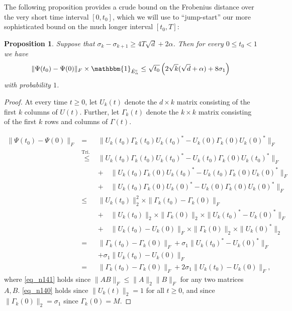 \documentclass[11pt,letterpaper]{article}
\newtheorem{proposition}[theorem]{Proposition}
\begin{document}
%
\noindent
The following proposition provides a crude bound on the Frobenius distance over the very short time interval $[0,t_0]$, which we will use to ``jump-start'' our more sophisticated bound on the much longer interval $[t_0, T]$:
%
\begin{proposition}\label{lemma_t0}
Suppose that  $\sigma_k - \sigma_{k+1} \geq 4T \sqrt{d} + 2\alpha$.
%
Then for every $0 \leq t_0 < 1$ we have
\begin{equation*}
    \|\Psi(t_0) - \Psi(0)\|_F \times \mathbbm{1}_{\hat{E}_\alpha^c} \leq \sqrt{t_0}\left(2 \sqrt{k} (\sqrt{d} + \alpha)  + 8\sigma_1\right)
\end{equation*}
%
with probability $1$.
\end{proposition}

\begin{proof}
%
At every time $t\geq 0$, let $U_k(t)$ denote the $d\times k$ matrix consisting of the first $k$ columns of $U(t)$.
%
Further, let $\Gamma_k(t)$ denote the $k\times k$ matrix consisting of the first $k$ rows and columns of $\Gamma(t)$.

\begin{eqnarray} \label{eq_u4}
    \|\Psi(t_0) - \Psi(0)\|_F &=& \|U_k(t_0) \Gamma_k(t_0) U_k(t_0)^\ast - U_k(0) \Gamma_k(0) U_k(0)^\ast\|_F \nonumber\\
        &\stackrel{\textrm{Tri.\ Ineq.}}{\leq} & \|U_k(t_0) \Gamma_k(t_0) U_k(t_0)^\ast -  U_k(t_0) \Gamma_k(0) U_k(t_0)^\ast\|_F \nonumber \\
        & & + \quad \|U_k(t_0) \Gamma_k(0) U_k(t_0)^\ast - U_k(t_0) \Gamma_k(0) U_k(0)^\ast\|_F \nonumber\\
        & & + \quad \|U_k(t_0) \Gamma_k(0) U_k(0)^\ast - U_k(0) \Gamma_k(0) U_k(0)^\ast \|_F \nonumber\\
                &\leq & \|U_k(t_0)\|_2^2 \times  \|\Gamma_k(t_0) -\Gamma_k(0)\|_F \nonumber\\
                & & + \quad \|U_k(t_0)\|_2 \times \|\Gamma_k(0)\|_2 \times \| U_k(t_0)^\ast - U_k(0)^\ast\|_F \nonumber\\
        & & + \quad \|U_k(t_0) -U_k(0)\|_F \times \|\Gamma_k(0)\|_2 \times \|U_k(0)^\ast \|_2 \label{eq_n141}\\
        &=& \|\Gamma_k(t_0) -\Gamma_k(0)\|_F  +  \sigma_1  \| U_k(t_0)^\ast - U_k(0)^\ast\|_F \nonumber\\
        & & + \sigma_1 \|U_k(t_0) -U_k(0)\|_F \label{eq_n140}\\
                &=& \|\Gamma_k(t_0) -\Gamma_k(0)\|_F  + 2\sigma_1 \|U_k(t_0) -U_k(0)\|_F,
        \end{eqnarray}
     where \eqref{eq_n141} holds since $\|AB\|_F \leq \|A\|_2 \|B\|_F$ for any two matrices $A,B$. 
        \eqref{eq_n140} holds since $\|U_k(t)\|_2 = 1$ for all $t\geq 0$, and since $\|\Gamma_k(0)\|_2 = \sigma_1$ since $\Gamma_k(0) = M$.


\end{proof}
\end{document}
